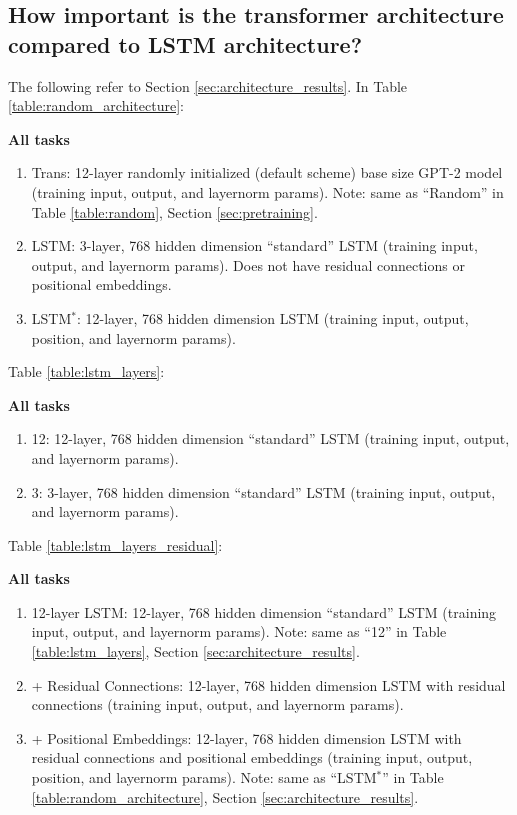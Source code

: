 \subsection{How important is the transformer architecture compared to LSTM architecture?}

The following refer to Section \ref{sec:architecture_results}.
In Table \ref{table:random_architecture}:

\textbf{All tasks}
\begin{enumerate}
    \item Trans: 12-layer randomly initialized (default scheme) base size GPT-2 model (training input, output, and layernorm params). Note: same as ``Random'' in Table \ref{table:random}, Section \ref{sec:pretraining}.
    \item LSTM: 3-layer, 768 hidden dimension ``standard'' LSTM (training input, output, and layernorm params). Does not have residual connections or positional embeddings.
    \item LSTM$^*$: 12-layer, 768 hidden dimension LSTM (training input, output, position, and layernorm params). 
\end{enumerate}

Table \ref{table:lstm_layers}:

\textbf{All tasks}
\begin{enumerate}
    \item 12: 12-layer, 768 hidden dimension ``standard'' LSTM (training input, output, and layernorm params).
    \item 3: 3-layer, 768 hidden dimension ``standard'' LSTM (training input, output, and layernorm params).
\end{enumerate}

Table \ref{table:lstm_layers_residual}:

\textbf{All tasks}
\begin{enumerate}
    \item 12-layer LSTM: 12-layer, 768 hidden dimension ``standard'' LSTM (training input, output, and layernorm params). Note: same as ``12'' in Table \ref{table:lstm_layers}, Section \ref{sec:architecture_results}.
    \item + Residual Connections: 12-layer, 768 hidden dimension LSTM with residual connections (training input, output, and layernorm params).
    \item + Positional Embeddings: 12-layer, 768 hidden dimension LSTM with residual connections and positional embeddings (training input, output, position, and layernorm params). Note: same as ``LSTM$^*$'' in Table \ref{table:random_architecture}, Section \ref{sec:architecture_results}.
\end{enumerate}
\vspace{4em}

